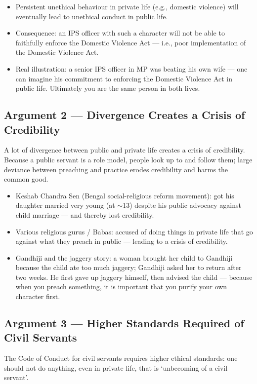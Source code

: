 \begin{itemize}
\item Persistent unethical behaviour in private life (e.g., domestic violence) will eventually lead to unethical conduct in public life.
\item Consequence: an IPS officer with such a character will not be able to faithfully enforce the Domestic Violence Act --- i.e., poor implementation of the Domestic Violence Act.
\item Real illustration: a senior IPS officer in MP was beating his own wife --- one can imagine his commitment to enforcing the Domestic Violence Act in public life. Ultimately you are the same person in both lives.
\end{itemize}

\subsection{Argument 2 --- Divergence Creates a Crisis of Credibility}

A lot of divergence between public and private life creates a crisis of credibility. Because a public servant is a role model, people look up to and follow them; large deviance between preaching and practice erodes credibility and harms the common good.

\begin{itemize}
\item Keshab Chandra Sen (Bengal social-religious reform movement): got his daughter married very young (at $\sim$13) despite his public advocacy against child marriage --- and thereby lost credibility.
\item Various religious gurus / Babas: accused of doing things in private life that go against what they preach in public --- leading to a crisis of credibility.
\item Gandhiji and the jaggery story: a woman brought her child to Gandhiji because the child ate too much jaggery; Gandhiji asked her to return after two weeks. He first gave up jaggery himself, then advised the child --- because when you preach something, it is important that you purify your own character first.
\end{itemize}

\subsection{Argument 3 --- Higher Standards Required of Civil Servants}

The Code of Conduct for civil servants requires higher ethical standards: one should not do anything, even in private life, that is `unbecoming of a civil servant'.

